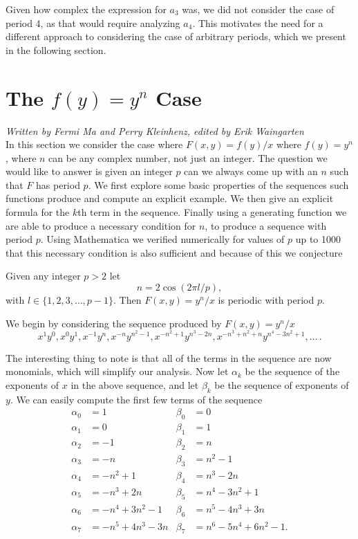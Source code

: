 \documentclass[12pt]{article}
\begin{document}
Given how complex the expression for $a_3$ was, we did not consider the case of period 4, as that would require analyzing $a_4$. This motivates the need for a different approach to considering the case of arbitrary periods, which we present in the following section.

\section{The $f(y) = y^n$ Case}
\label{general case}

\emph{Written by Fermi Ma and Perry Kleinhenz, edited by Erik Waingarten}\\

In this section we consider the case where $F(x,y) = f(y)/x$ where $f(y) = y^n$, where $n$ can be any complex number, not just an integer. The question we would like to answer is given an integer $p$ can we always come up with an $n$ such that $F$ has period $p$. We first explore some basic properties of the sequences such functions produce and compute an explicit example. We then give an explicit formula for the $k$th term in the sequence. Finally using a generating function we are able to produce a necessary condition for $n$, to produce a sequence with period $p$. Using Mathematica we verified numerically for values of $p$ up to 1000 that this necessary condition is also sufficient and because of this we conjecture 
\begin{conjecture}
\label{cos}
Given any integer $p>2$ let 
\begin{equation*}
n = 2 \cos(2 \pi l/p),
\end{equation*}
with $l \in \{1,2,3, \ldots, p-1 \}$. Then $F(x,y) = y^n/x$ is periodic with period $p$.
\end{conjecture}

We begin by considering the sequence produced by $F(x,y) = y^n/x$ 
\begin{equation*}
x^1y^0, x^0y^1, x^{-1}y^{n}, x^{-n}y^{n^2-1}, x^{-n^2+1}y^{n^3-2n},x^{-n^3+n^2+n}y^{n^4-3n^2+1}, \dots \,.
\end{equation*}

The interesting thing to note is that all of the terms in the sequence are now monomials, which will simplify our analysis. Now let $\alpha_k$ be the sequence of the exponents of $x$ in the above sequence, and let $\beta_k$ be the sequence of exponents of $y$. We can easily compute the first few terms of the sequence
\begin{align*}
\alpha_0 &= 1  &\beta_0& = 0\\
\alpha_1 &= 0 &\beta_1& = 1\\
\alpha_2 &= -1  &\beta_2& = n\\
\alpha_3 &= -n &\beta_3& = n^2-1\\
\alpha_4 &= -n^2+1 &\beta_4& = n^3-2n\\
\alpha_5 &= -n^3+2n &\beta_5& =n^4-3n^2+1\\ 
\alpha_6 &= -n^4+3n^2 -1 &\beta_6& =n^5-4n^3+3n \\ 
\alpha_7 &= -n^5+4n^3 - 3n &\beta_7& =n^6-5n^4+6n^2 - 1.
\end{align*}
\end{document}
